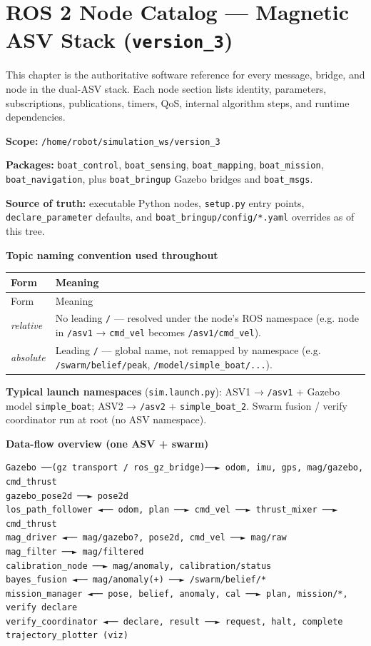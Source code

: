 \chapter{ROS 2 Node Catalog --- Magnetic ASV Stack (\texttt{version\_3})}
\label{ch:ros-catalog}

This chapter is the authoritative software reference for every message, bridge, and node in the dual-ASV stack. Each node section lists identity, parameters, subscriptions, publications, timers, QoS, internal algorithm steps, and runtime dependencies.


\textbf{Scope:} \texttt{/home/robot/simulation\_ws/version\_3}

\textbf{Packages:} \texttt{boat\_control}, \texttt{boat\_sensing}, \texttt{boat\_mapping}, \texttt{boat\_mission}, \texttt{boat\_navigation}, plus \texttt{boat\_bringup} Gazebo bridges and \texttt{boat\_msgs}.

\textbf{Source of truth:} executable Python nodes, \texttt{setup.py} entry points, \texttt{declare\_parameter} defaults, and \texttt{boat\_bringup/config/*.yaml} overrides as of this tree.


\textbf{Topic naming convention used throughout}


\begin{center}
\small
\begin{longtable}{@{}lp{10cm}@{}}
\toprule
Form & Meaning \\
\midrule
\endfirsthead
\toprule
Form & Meaning \\
\midrule
\endhead
\emph{relative} & No leading \texttt{/} --- resolved under the node's ROS namespace (e.g. node in \texttt{/asv1} → \texttt{cmd\_vel} becomes \texttt{/asv1/cmd\_vel}). \\
\emph{absolute} & Leading \texttt{/} --- global name, not remapped by namespace (e.g. \texttt{/swarm/belief/peak}, \texttt{/model/simple\_boat/...}). \\
\bottomrule
\end{longtable}
\end{center}


\textbf{Typical launch namespaces} (\texttt{sim.launch.py}): ASV1 → \texttt{/asv1} + Gazebo model \texttt{simple\_boat}; ASV2 → \texttt{/asv2} + \texttt{simple\_boat\_2}. Swarm fusion / verify coordinator run at root (no ASV namespace).


\textbf{Data-flow overview (one ASV + swarm)}


\begin{verbatim}
Gazebo ──(gz transport / ros_gz_bridge)──► odom, imu, gps, mag/gazebo, cmd_thrust
gazebo_pose2d ──► pose2d
los_path_follower ◄── odom, plan ──► cmd_vel ──► thrust_mixer ──► cmd_thrust
mag_driver ◄── mag/gazebo?, pose2d, cmd_vel ──► mag/raw
mag_filter ──► mag/filtered
calibration_node ──► mag/anomaly, calibration/status
bayes_fusion ◄── mag/anomaly(+) ──► /swarm/belief/*
mission_manager ◄── pose, belief, anomaly, cal ──► plan, mission/*, verify declare
verify_coordinator ◄── declare, result ──► request, halt, complete
trajectory_plotter (viz)
\end{verbatim}



